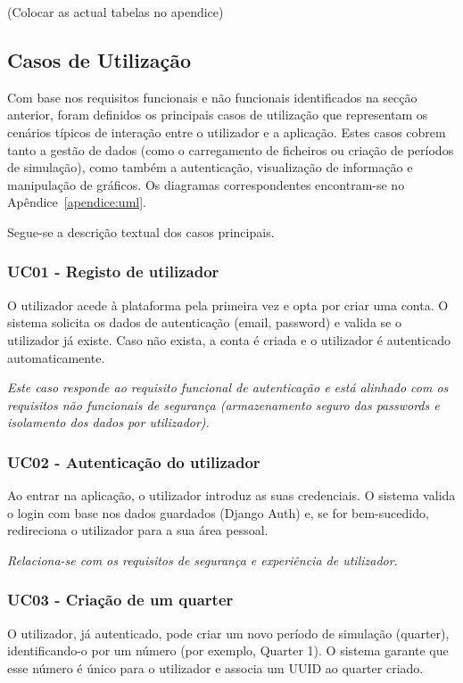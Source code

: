 (Colocar as actual tabelas no apendice)


\subsection{Casos de Utilização}
Com base nos requisitos funcionais e não funcionais identificados na secção anterior, foram definidos os principais casos de utilização que representam os cenários típicos de interação entre o utilizador e a aplicação. Estes casos cobrem tanto a gestão de dados (como o carregamento de ficheiros ou criação de períodos de simulação), como também a autenticação, visualização de informação e manipulação de gráficos. Os diagramas correspondentes encontram-se no Apêndice~\ref{apendice:uml}.

Segue-se a descrição textual dos casos principais.

\subsubsection{UC01 - Registo de utilizador}

O utilizador acede à plataforma pela primeira vez e opta por criar uma conta. O sistema solicita os dados de autenticação (email, password) e valida se o utilizador já existe. Caso não exista, a conta é criada e o utilizador é autenticado automaticamente.

\textit{Este caso responde ao requisito funcional de autenticação e está alinhado com os requisitos não funcionais de segurança (armazenamento seguro das passwords e isolamento dos dados por utilizador).}

\subsubsection{UC02 - Autenticação do utilizador}

Ao entrar na aplicação, o utilizador introduz as suas credenciais. O sistema valida o login com base nos dados guardados (Django Auth) e, se for bem-sucedido, redireciona o utilizador para a sua área pessoal.

\textit{Relaciona-se com os requisitos de segurança e experiência de utilizador.}

\subsubsection{UC03 - Criação de um quarter}

O utilizador, já autenticado, pode criar um novo período de simulação (quarter), identificando-o por um número (por exemplo, Quarter 1). O sistema garante que esse número é único para o utilizador e associa um UUID ao quarter criado.

